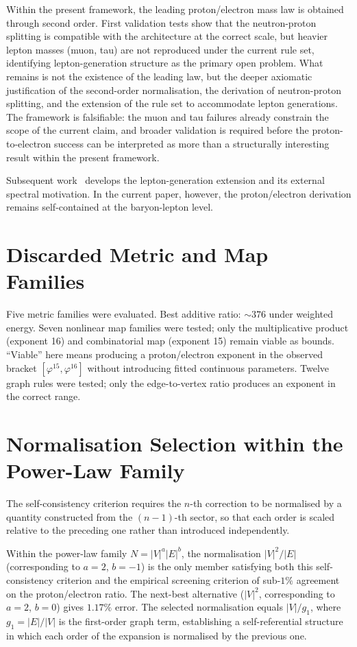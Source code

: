 \documentclass[12pt]{article}
\newcommand{\phig}{\varphi}
\begin{document}
Within the present framework, the leading proton/electron mass law is obtained through second order. First validation tests show that the neutron-proton splitting is compatible with the architecture at the correct scale, but heavier lepton masses (muon, tau) are not reproduced under the current rule set, identifying lepton-generation structure as the primary open problem. What remains is not the existence of the leading law, but the deeper axiomatic justification of the second-order normalisation, the derivation of neutron-proton splitting, and the extension of the rule set to accommodate lepton generations. The framework is falsifiable: the muon and tau failures already constrain the scope of the current claim, and broader validation is required before the proton-to-electron success can be interpreted as more than a structurally interesting result within the present framework.

Subsequent work~\citep{SmartII, SmartIII} develops the lepton-generation extension and its external spectral motivation. In the current paper, however, the proton/electron derivation remains self-contained at the baryon-lepton level.

\appendix
\section{Discarded Metric and Map Families}\label{app:discarded}

Five metric families were evaluated. Best additive ratio: $\sim\!376$ under weighted energy. Seven nonlinear map families were tested; only the multiplicative product (exponent 16) and combinatorial map (exponent 15) remain viable as bounds. ``Viable'' here means producing a proton/electron exponent in the observed bracket $[\phig^{15}, \phig^{16}]$ without introducing fitted continuous parameters. Twelve graph rules were tested; only the edge-to-vertex ratio produces an exponent in the correct range.

\section{Normalisation Selection within the Power-Law Family}\label{app:uniqueness}

The self-consistency criterion requires the $n$-th correction to be normalised by a quantity constructed from the $(n{-}1)$-th sector, so that each order is scaled relative to the preceding one rather than introduced independently.

Within the power-law family $N = |V|^a |E|^b$, the normalisation $|V|^2/|E|$ (corresponding to $a = 2$, $b = -1$) is the only member satisfying both this self-consistency criterion and the empirical screening criterion of sub-$1\%$ agreement on the proton/electron ratio. The next-best alternative ($|V|^2$, corresponding to $a = 2$, $b = 0$) gives $1.17\%$ error. The selected normalisation equals $|V|/g_1$, where $g_1 = |E|/|V|$ is the first-order graph term, establishing a self-referential structure in which each order of the expansion is normalised by the previous one.



\end{document}
